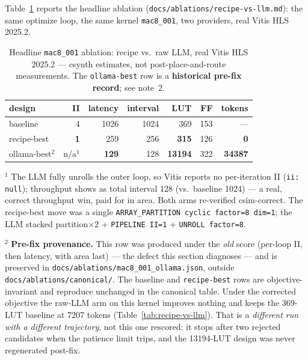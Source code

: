 Table~\ref{tab:headline} reports the headline ablation
(\texttt{docs/ablations/recipe-vs-llm.md}): the same optimize loop, the same kernel
\texttt{mac8\_001}, two providers, real Vitis HLS 2025.2.

\begin{table}[h]
\centering\small
\caption{Headline \texttt{mac8\_001} ablation: recipe vs.\ raw LLM, real Vitis HLS
2025.2 --- csynth estimates, not post-place-and-route measurements. The
\texttt{ollama-best} row is a \textbf{historical pre-fix record}; see note~2.}
\label{tab:headline}
\begin{tabular}{lrrrrrr}
\toprule
design & II & latency & interval & LUT & FF & tokens \\
\midrule
baseline      & 4   & 1026 & 1024 & 369        & 153 & --- \\
recipe-best   & \textbf{1} & 259  & 256  & \textbf{315}   & 126 & \textbf{0} \\
ollama-best$^{2}$ & n/a$^{1}$ & \textbf{129} & 128  & \textbf{13194} & 322 & \textbf{34387} \\
\bottomrule
\end{tabular}

\vspace{2pt}
{\footnotesize $^{1}$ The LLM fully unrolls the outer loop, so Vitis reports no
per-iteration II (\texttt{ii: null}); throughput shows as total interval 128
(vs.\ baseline 1024) --- a real, correct throughput win, paid for in area. Both arms
re-verified csim-correct. The recipe-best move was a single
\texttt{ARRAY\_PARTITION cyclic factor=8 dim=1}; the LLM stacked
partition$\times$2 + \texttt{PIPELINE II=1} + \texttt{UNROLL factor=8}.\par
$^{2}$ \textbf{Pre-fix provenance.} This row was produced under the \emph{old} score
(per-loop II, then latency, with area last) --- the defect this section diagnoses ---
and is preserved in \texttt{docs/ablations/mac8\_001\_ollama.json}, outside
\texttt{docs/ablations/canonical/}. The baseline and \texttt{recipe-best} rows are
objective-invariant and reproduce unchanged in the canonical table. Under the
corrected objective the raw-LLM arm on this kernel improves nothing and keeps the
369-LUT baseline at 7207 tokens (Table~\ref{tab:recipe-vs-llm}). That is a
\emph{different run with a different trajectory}, not this one rescored: it stops
after two rejected candidates when the patience limit trips, and the 13194-LUT design
was never regenerated post-fix.}
\end{table}

